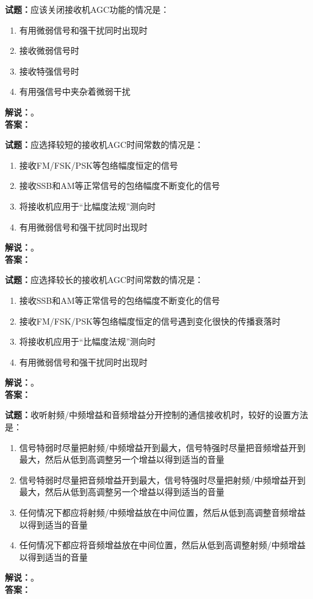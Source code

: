 \documentclass{ctexbook}
\begin{document}
\noindent\textbf{试题：}应该关闭接收机AGC功能的情况是：
\begin{enumerate}[leftmargin=3em]
  \item 有用微弱信号和强干扰同时出现时
  \item 接收微弱信号时
  \item 接收特强信号时
  \item 有用强信号中夹杂着微弱干扰
\end{enumerate}
\noindent\textbf{解说：}\textbf{}。\\\noindent\textbf{答案：}

\vspace{\baselineskip}

\noindent\textbf{试题：}应选择较短的接收机AGC时间常数的情况是：
\begin{enumerate}[leftmargin=3em]
  \item 接收FM/FSK/PSK等包络幅度恒定的信号
  \item 接收SSB和AM等正常信号的包络幅度不断变化的信号
  \item 将接收机应用于“比幅度法规”测向时
  \item 有用微弱信号和强干扰同时出现时
\end{enumerate}
\noindent\textbf{解说：}\textbf{}。\\\noindent\textbf{答案：}

\vspace{\baselineskip}

\noindent\textbf{试题：}应选择较长的接收机AGC时间常数的情况是：
\begin{enumerate}[leftmargin=3em]
  \item 接收SSB和AM等正常信号的包络幅度不断变化的信号
  \item 接收FM/FSK/PSK等包络幅度恒定的信号遇到变化很快的传播衰落时
  \item 将接收机应用于“比幅度法规”测向时
  \item 有用微弱信号和强干扰同时出现时
\end{enumerate}
\noindent\textbf{解说：}\textbf{}。\\\noindent\textbf{答案：}

\vspace{\baselineskip}

\noindent\textbf{试题：}收听射频/中频增益和音频增益分开控制的通信接收机时，较好的设置方法是：
\begin{enumerate}[leftmargin=3em]
  \item 信号特弱时尽量把射频/中频增益开到最大，信号特强时尽量把音频增益开到最大，然后从低到高调整另一个增益以得到适当的音量
  \item 信号特弱时尽量把音频增益开到最大，信号特强时尽量把射频/中频增益开到最大，然后从低到高调整另一个增益以得到适当的音量
  \item 任何情况下都应将射频/中频增益放在中间位置，然后从低到高调整音频增益以得到适当的音量
  \item 任何情况下都应将音频增益放在中间位置，然后从低到高调整射频/中频增益以得到适当的音量
\end{enumerate}
\noindent\textbf{解说：}\textbf{}。\\\noindent\textbf{答案：}
\end{document}
